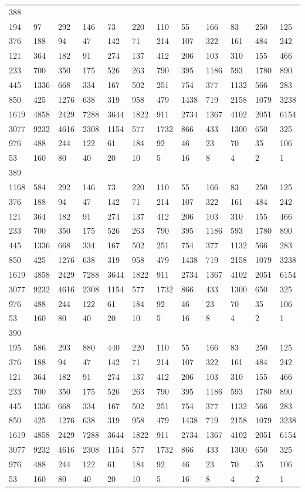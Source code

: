 \begin{longtable}{llllllllllll}
388&&&&&&&&&&&\\
194& 97& 292& 146& 73& 220& 110& 55& 166& 83& 250& 125\\
376& 188& 94& 47& 142& 71& 214& 107& 322& 161& 484& 242\\
121& 364& 182& 91& 274& 137& 412& 206& 103& 310& 155& 466\\
233& 700& 350& 175& 526& 263& 790& 395& 1186& 593& 1780& 890\\
445& 1336& 668& 334& 167& 502& 251& 754& 377& 1132& 566& 283\\
850& 425& 1276& 638& 319& 958& 479& 1438& 719& 2158& 1079& 3238\\
1619& 4858& 2429& 7288& 3644& 1822& 911& 2734& 1367& 4102& 2051& 6154\\
3077& 9232& 4616& 2308& 1154& 577& 1732& 866& 433& 1300& 650& 325\\
976& 488& 244& 122& 61& 184& 92& 46& 23& 70& 35& 106\\
53& 160& 80& 40& 20& 10& 5& 16& 8& 4& 2& 1\\

389&&&&&&&&&&&\\
1168& 584& 292& 146& 73& 220& 110& 55& 166& 83& 250& 125\\
376& 188& 94& 47& 142& 71& 214& 107& 322& 161& 484& 242\\
121& 364& 182& 91& 274& 137& 412& 206& 103& 310& 155& 466\\
233& 700& 350& 175& 526& 263& 790& 395& 1186& 593& 1780& 890\\
445& 1336& 668& 334& 167& 502& 251& 754& 377& 1132& 566& 283\\
850& 425& 1276& 638& 319& 958& 479& 1438& 719& 2158& 1079& 3238\\
1619& 4858& 2429& 7288& 3644& 1822& 911& 2734& 1367& 4102& 2051& 6154\\
3077& 9232& 4616& 2308& 1154& 577& 1732& 866& 433& 1300& 650& 325\\
976& 488& 244& 122& 61& 184& 92& 46& 23& 70& 35& 106\\
53& 160& 80& 40& 20& 10& 5& 16& 8& 4& 2& 1\\

390&&&&&&&&&&&\\
195& 586& 293& 880& 440& 220& 110& 55& 166& 83& 250& 125\\
376& 188& 94& 47& 142& 71& 214& 107& 322& 161& 484& 242\\
121& 364& 182& 91& 274& 137& 412& 206& 103& 310& 155& 466\\
233& 700& 350& 175& 526& 263& 790& 395& 1186& 593& 1780& 890\\
445& 1336& 668& 334& 167& 502& 251& 754& 377& 1132& 566& 283\\
850& 425& 1276& 638& 319& 958& 479& 1438& 719& 2158& 1079& 3238\\
1619& 4858& 2429& 7288& 3644& 1822& 911& 2734& 1367& 4102& 2051& 6154\\
3077& 9232& 4616& 2308& 1154& 577& 1732& 866& 433& 1300& 650& 325\\
976& 488& 244& 122& 61& 184& 92& 46& 23& 70& 35& 106\\
53& 160& 80& 40& 20& 10& 5& 16& 8& 4& 2& 1\\


\end{longtable}
